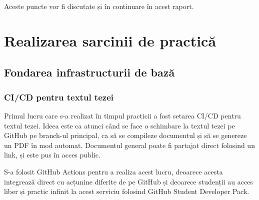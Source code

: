 \documentclass[a4paper,12pt]{report}
\begin{document}
Aceste puncte vor fi discutate și în continuare în acest raport.


\chapter{Realizarea sarcinii de practică}

\section{Fondarea infrastructurii de bază}

\subsection{\ac{CI/CD} pentru textul tezei}

Primul lucru care s-a realizat în timpul practicii a fost setarea \ac{CI/CD} pentru textul tezei.
Ideea este ca atunci când se face o schimbare la textul tezei pe GitHub pe branch-ul principal,
ca să se compileze documentul și să se genereze un \ac{PDF} în mod automat.
Documentul general poate fi partajat direct folosind un link, și este pus în acces public.

S-a folosit GitHub Actions pentru a realiza acest lucru, deoarece acesta integrează direct cu 
acțunine diferite de pe GitHub și deoarece studenții au acces liber și practic infinit
la acest serviciu folosind GitHub Student Developer Pack\cite{github_developer_pack}.
\end{document}
